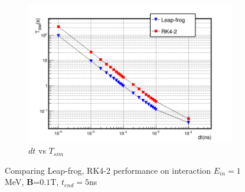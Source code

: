 \documentclass[a4paper,oneside,12pt]{report}
\numberwithin{equation}{chapter}
\begin{document}
{\begin{figure}
    \begin{subfigure}{0.8\textwidth}
        \centering
        \includegraphics[width=\linewidth]{./figures/analiz/mag_lf_rk2_dt-Tsim.png}
        \caption*{$dt$ vs $T_{sim}$}
    \end{subfigure}
    \caption{Comparing Leap-frog, RK4-2 performance on \eB interaction $E_{in}=1$MeV, \textbf{B}=$0.1$T, $t_{end}=5$ns}
    \label{fig:mag_lf_rk2_comparison}
\end{figure} \fi
\begin{figure}[h]
    \centering
    \qquad{}%

\end{figure}}
\end{document}
